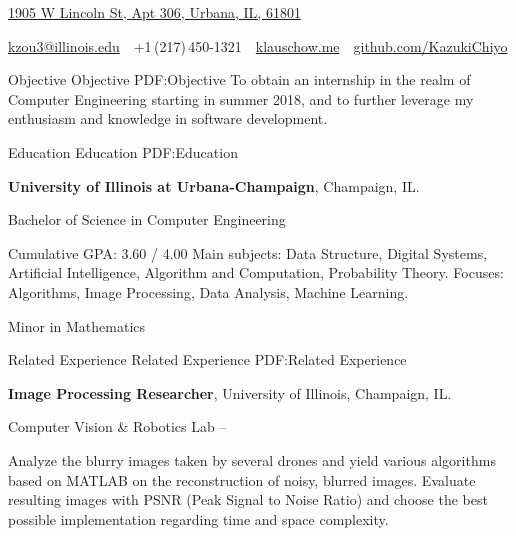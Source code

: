 \documentclass[letterpaper,MMMyyyy,nonstopmode]{simpleresumecv}
\newcommand{\CVAuthor}{Kexuan (Klaus) Zou}
\newcommand{\CVWebpage}{github.com/KazukiChiyo}
\begin{document}

\Title{\CVAuthor}

\begin{SubTitle}
\href{https://www.google.es/maps/place/1905+N+Lincoln+Ave,+Urbana,+IL+61801,+USA/@40.1299598,-88.2218938,17z/data=!3m1!4b1!4m5!3m4!1s0x880cd7625bc1ff43:0x85446ada3a3d311d!8m2!3d40.1299598!4d-88.2196998?hl=en}
{1905 W Lincoln St, Apt 306, Urbana, IL, 61801}
\par
\href{mailto:kzou3@illinois.edu}
{kzou3@illinois.edu}
\,\SubBulletSymbol\,
+1\,(217)\,450-1321
\,\SubBulletSymbol\,
\href{https://www.klauschow.me}
{\url{klauschow.me}}
\,\SubBulletSymbol\,
\href{https://github.com/KazukiChiyo}
{\url{\CVWebpage}}
\end{SubTitle}

\begin{Body}
\Section
{Objective}
{Objective}
{PDF:Objective}
\Entry
To obtain an internship in the realm of Computer Engineering starting in summer 2018, and to further leverage my enthusiasm and knowledge in software development.

\Section
{Education}
{Education}
{PDF:Education}

\Entry
\textbf{University of Illinois at Urbana-Champaign},
Champaign, IL.

\Gap
\BulletItem
Bachelor of Science in Computer Engineering
\hfill
{}
\begin{Detail}
\SubBulletItem
Cumulative GPA: 3.60 / 4.00
\SubBulletItem
Main subjects: Data Structure, Digital Systems, Artificial Intelligence, Algorithm and Computation, Probability Theory.
\SubBulletItem
Focuses:
Algorithms, Image Processing, Data Analysis, Machine Learning.
\end{Detail}

\Gap
\BulletItem
Minor in Mathematics
\hfill
{}


\Section
{Related Experience}
{Related Experience}
{PDF:Related Experience}

\Entry
\textbf{Image Processing Researcher}, University of Illinois, Champaign, IL.

\Gap
\BulletItem
Computer Vision \& Robotics Lab
\hfill
{} --
\begin{Detail}
\SubBulletItem
Analyze the blurry images taken by several drones and yield various algorithms based on MATLAB on the reconstruction of noisy, blurred images.
\SubBulletItem
Evaluate resulting images with PSNR (Peak Signal to Noise Ratio) and choose the best possible implementation regarding time and space complexity.
\end{Detail}



\end{Body}
\end{document}
